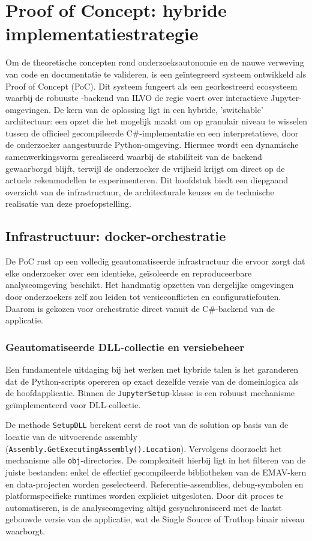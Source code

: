 \chapter{Proof of Concept: hybride implementatiestrategie}
\label{ch:poc}

Om de theoretische concepten rond onderzoeksautonomie en de nauwe verweving van code en documentatie te valideren, is een geïntegreerd systeem ontwikkeld als Proof of Concept (PoC). Dit systeem fungeert als een georkestreerd ecosysteem waarbij de robuuste -backend van ILVO de regie voert over interactieve Jupyter-omgevingen. De kern van de oplossing ligt in een hybride, 'switchable' architectuur: een opzet die het mogelijk maakt om op granulair niveau te wisselen tussen de officieel gecompileerde C\#-implementatie en een interpretatieve, door de onderzoeker aangestuurde Python-omgeving. Hiermee wordt een dynamische samenwerkingsvorm gerealiseerd waarbij de stabiliteit van de backend gewaarborgd blijft, terwijl de onderzoeker de vrijheid krijgt om direct op de actuele rekenmodellen te experimenteren. Dit hoofdstuk biedt een diepgaand overzicht van de infrastructuur, de architecturale keuzes en de technische realisatie van deze proefopstelling.

\section{Infrastructuur: docker-orchestratie}

De PoC rust op een volledig geautomatiseerde infrastructuur die ervoor zorgt dat elke onderzoeker over een identieke, geïsoleerde en reproduceerbare analyseomgeving beschikt. Het handmatig opzetten van dergelijke omgevingen door onderzoekers zelf zou leiden tot versieconflicten en configuratiefouten. Daarom is gekozen voor orchestratie direct vanuit de C\#-backend van de applicatie.

\subsection{Geautomatiseerde DLL-collectie en versiebeheer}
Een fundamentele uitdaging bij het werken met hybride talen is het garanderen dat de Python-scripts opereren op exact dezelfde versie van de domeinlogica als de hoofdapplicatie. Binnen de \texttt{JupyterSetup}-klasse is een robuust mechanisme geïmplementeerd voor DLL-collectie. 

De methode \texttt{SetupDLL} berekent eerst de root van de solution op basis van de locatie van de uitvoerende assembly (\nolinkurl{Assembly.GetExecutingAssembly().Location}). Vervolgens doorzoekt het mechanisme alle \texttt{obj}-directories. De complexiteit hierbij ligt in het filteren van de juiste bestanden: enkel de effectief gecompileerde bibliotheken van de EMAV-kern en data-projecten worden geselecteerd. Referentie-assemblies, debug-symbolen en platformspecifieke runtimes worden expliciet uitgesloten. Door dit proces te automatiseren, is de analyseomgeving altijd gesynchroniseerd met de laatst gebouwde versie van de applicatie, wat de \textquotedbl Single Source of Truth\textquotedbl \@ op binair niveau waarborgt.


